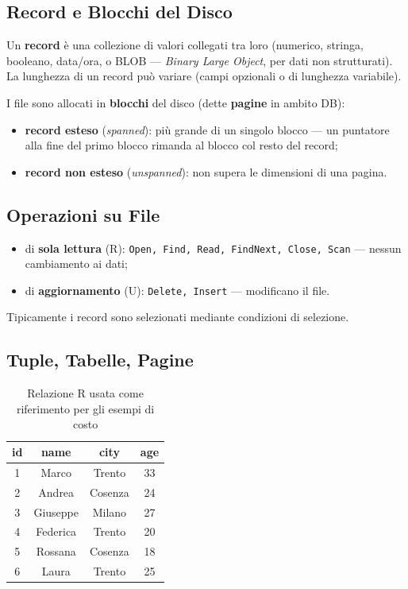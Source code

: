 \documentclass[12pt, a4paper]{article}
\begin{document}
\subsection{Record e Blocchi del Disco}

Un \textbf{record} è una collezione di valori collegati tra loro (numerico, stringa, booleano, data/ora, o BLOB — \textit{Binary Large Object}, per dati non strutturati). La lunghezza di un record può variare (campi opzionali o di lunghezza variabile).

I file sono allocati in \textbf{blocchi} del disco (dette \textbf{pagine} in ambito DB):
\begin{itemize}
    \item \textbf{record esteso} (\textit{spanned}): più grande di un singolo blocco — un puntatore alla fine del primo blocco rimanda al blocco col resto del record;
    \item \textbf{record non esteso} (\textit{unspanned}): non supera le dimensioni di una pagina.
\end{itemize}

\subsection{Operazioni su File}
\begin{itemize}
    \item di \textbf{sola lettura} (R): \texttt{Open, Find, Read, FindNext, Close, Scan} — nessun cambiamento ai dati;
    \item di \textbf{aggiornamento} (U): \texttt{Delete, Insert} — modificano il file.
\end{itemize}
Tipicamente i record sono selezionati mediante condizioni di selezione.

\subsection{Tuple, Tabelle, Pagine}

\begin{table}[H]
\centering
\begin{tabular}{@{}cccc@{}}
\toprule
id & name & city & age \\
\midrule
1 & Marco & Trento & 33 \\
2 & Andrea & Cosenza & 24 \\
3 & Giuseppe & Milano & 27 \\
4 & Federica & Trento & 20 \\
5 & Rossana & Cosenza & 18 \\
6 & Laura & Trento & 25 \\
\bottomrule
\end{tabular}
\caption{Relazione R usata come riferimento per gli esempi di costo}
\end{table}
\end{document}

